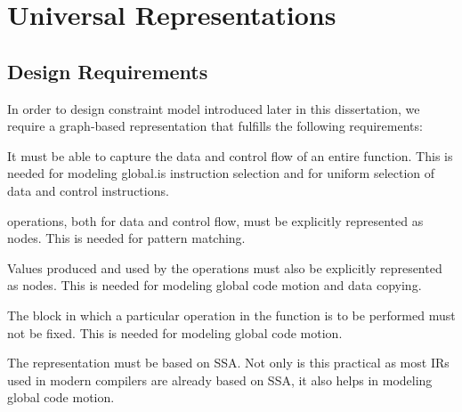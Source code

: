 %

\chapter{Universal Representations}




\section{Design Requirements}

In order to design \gls{constraint model} introduced later in this dissertation,
we require a \gls{graph}-based representation that fulfills the following
requirements:
%
\begin{requirements}
  \item {}
    It must be able to capture the data and control flow of an entire
    \gls{function}.
    This is needed for modeling \gls{global.is} \gls{instruction selection}
    and for uniform selection of data and control \glspl{instruction}.
  \item {}
    \Glspl{operation}, both for data and control flow, must be explicitly
    represented as \glspl{node}.
    This is needed for \gls{pattern matching}.
  \item {}
    Values produced and used by the \glspl{operation} must also be explicitly
    represented as \glspl{node}.
    This is needed for modeling \gls{global code motion} and \gls{data copying}.
  \item {}
    The \gls{block} in which a particular \gls{operation} in the \gls{function}
    is to be performed must not be fixed.
    This is needed for modeling \gls{global code motion}.
  \item {}
    The representation must be based on \gls{SSA}.
    Not only is this practical as most \glspl{IR} used in modern
    \glspl{compiler} are already based on \gls{SSA}, it also helps in modeling
    \gls{global code motion}.
\end{requirements}

